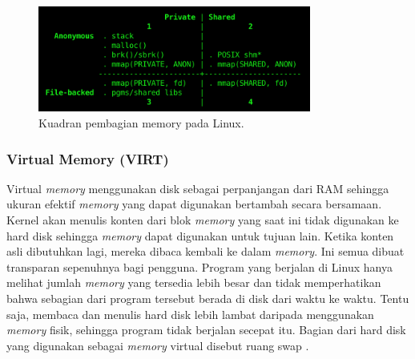 \begin{figure}[H]
    \includegraphics[width=0.8\textwidth, center]{images/programs/memory-quadrant.png}
    \caption{Kuadran pembagian memory pada Linux.}
    \label{fig:mem-quad}
\end{figure}

\subsubsection{Virtual Memory (VIRT)}
Virtual \textit{memory} menggunakan disk sebagai perpanjangan dari RAM sehingga ukuran efektif \textit{memory} yang dapat digunakan bertambah secara bersamaan. Kernel akan menulis konten dari blok \textit{memory} yang saat ini tidak digunakan ke hard disk sehingga \textit{memory} dapat digunakan untuk tujuan lain. Ketika konten asli dibutuhkan lagi, mereka dibaca kembali ke dalam \textit{memory}. Ini semua dibuat transparan sepenuhnya bagi pengguna. Program yang berjalan di Linux hanya melihat jumlah \textit{memory} yang tersedia lebih besar dan tidak memperhatikan bahwa sebagian dari program tersebut berada di disk dari waktu ke waktu. Tentu saja, membaca dan menulis hard disk lebih lambat daripada menggunakan \textit{memory} fisik, sehingga program tidak berjalan secepat itu. Bagian dari hard disk yang digunakan sebagai \textit{memory} virtual disebut ruang swap \cite{site:ltdp}.


